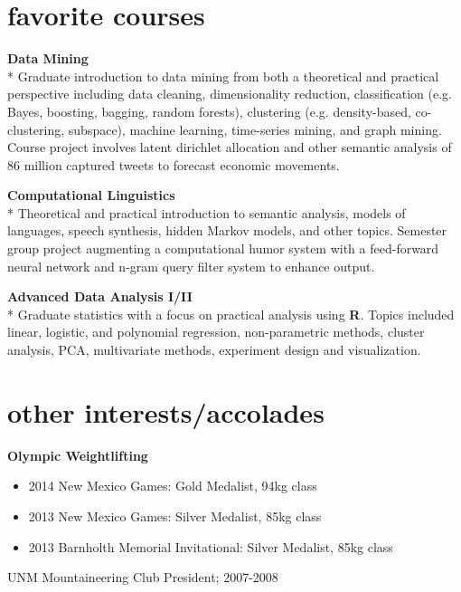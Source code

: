 \documentclass[]{friggeri-cv} %
\begin{document}



\section{favorite courses}
\begin{description}
  \item \textbf{Data Mining } \\*
    Graduate introduction to data mining from both a theoretical and practical
    perspective including data cleaning, dimensionality reduction,
    classification (e.g. Bayes, boosting, bagging, random forests), clustering
    (e.g. density-based, co-clustering, subspace), machine learning,
    time-series mining, and graph mining.  Course project involves latent
    dirichlet allocation and other semantic analysis of 86 million captured
    tweets to forecast economic movements. \hfill
   \item \textbf{Computational Linguistics} \\*
     Theoretical and practical introduction to semantic analysis, models of
     languages, speech synthesis, hidden Markov models, and other topics.
     Semester group project augmenting a computational humor system with a
     feed-forward neural network and n-gram query filter system to enhance
     output.
 \item \textbf{Advanced Data Analysis I/II} \\*
     Graduate statistics with a focus on practical analysis using \textbf{R}.
     Topics included linear, logistic, and polynomial regression,
     non-parametric methods, cluster analysis, PCA, multivariate methods,
     experiment design and visualization.
\end{description}


\section{other interests/accolades}
\textbf{Olympic Weightlifting}
\begin{itemize}
\item 2014 New Mexico Games: Gold Medalist, 94kg class
\item 2013 New Mexico Games: Silver Medalist, 85kg class
\item 2013 Barnholth Memorial Invitational: Silver Medalist, 85kg class
\end{itemize}
UNM Mountaineering Club President; 2007-2008
\end{document}
